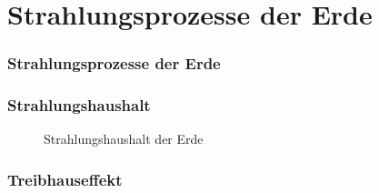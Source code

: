 \section{Strahlungsprozesse der Erde}





\begin{frame}
  \frametitle{Strahlungsprozesse der Erde}
\end{frame}

\begin{frame}
  \frametitle{Strahlungshaushalt}
  
  \begin{figure}
  	\caption{Strahlungshaushalt der Erde}
  \end{figure}
  
\end{frame}

\begin{frame}
  \frametitle{Treibhauseffekt}
\end{frame}


